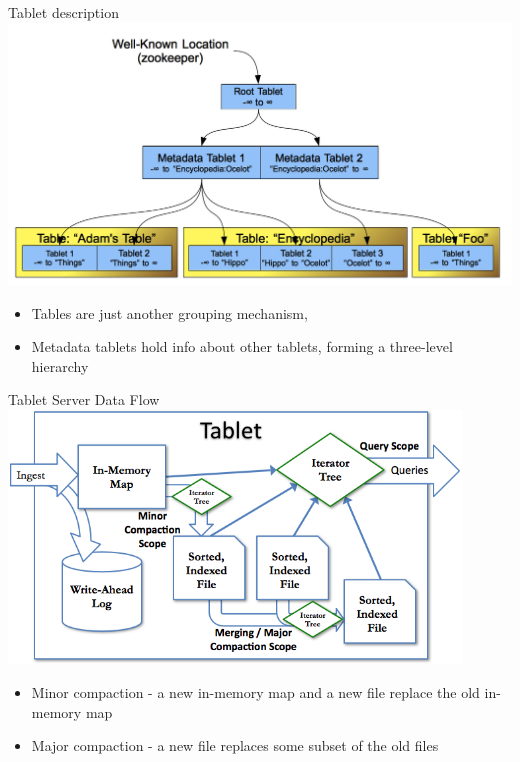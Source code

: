 \documentclass[t,landscape]{beamer}
\begin{document}
\begin{frame}{Tablet description}
\includegraphics[width=\textwidth]{images/tablet_organization.png}
\begin{itemize}
\item{Tables are just another grouping mechanism,}
\item{Metadata tablets hold info about other tablets, forming a three-level hierarchy}
\end{itemize}
\end{frame}

\begin{frame}{Tablet Server Data Flow}
\includegraphics[width=0.9\textwidth]{images/tablet_flow.png}
\begin{itemize}
\item{Minor compaction - a new in-memory map and a new file replace the old in-memory map}
\item{Major compaction - a new file replaces some subset of the old files}
\end{itemize}
\end{frame}
\end{document}
